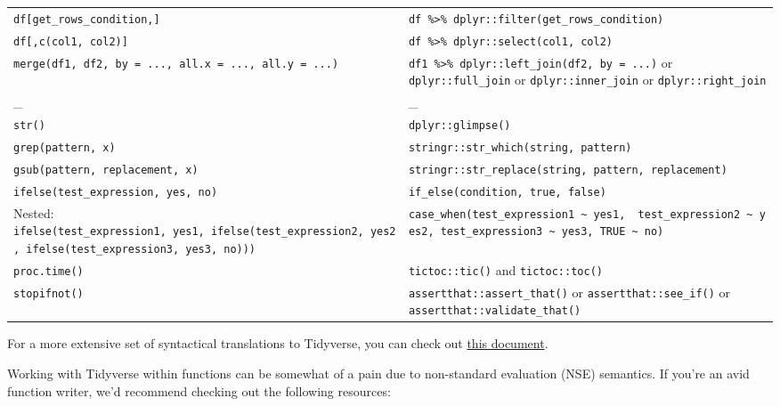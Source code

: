 \documentclass[
]{book}
\begin{document}
{\begin{longtable}[]{@{}
  >{\raggedright\arraybackslash}p{}
  >{\raggedright\arraybackslash}p{}@{}}
\texttt{df{[}get\_rows\_condition,{]}} & \texttt{df\ \%\textgreater{}\%\ dplyr::filter(get\_rows\_condition)} \\
\texttt{df{[},c(col1,\ col2){]}} & \texttt{df\ \%\textgreater{}\%\ dplyr::select(col1,\ col2)} \\
\texttt{merge(df1,\ df2,\ by\ =\ ...,\ all.x\ =\ ...,\ all.y\ =\ ...)} & \texttt{df1\ \%\textgreater{}\%\ dplyr::left\_join(df2,\ by\ =\ ...)} or \texttt{dplyr::full\_join} or \texttt{dplyr::inner\_join} or \texttt{dplyr::right\_join} \\
\_ & \_ \\
\texttt{str()} & \texttt{dplyr::glimpse()} \\
\texttt{grep(pattern,\ x)} & \texttt{stringr::str\_which(string,\ pattern)} \\
\texttt{gsub(pattern,\ replacement,\ x)} & \texttt{stringr::str\_replace(string,\ pattern,\ replacement)} \\
\texttt{ifelse(test\_expression,\ yes,\ no)} & \texttt{if\_else(condition,\ true,\ false)} \\
Nested: \texttt{ifelse(test\_expression1,\ yes1,\ ifelse(test\_expression2,\ yes2,\ ifelse(test\_expression3,\ yes3,\ no)))} & \texttt{case\_when(test\_expression1\ \textasciitilde{}\ yes1,\ \ test\_expression2\ \textasciitilde{}\ yes2,\ test\_expression3\ \textasciitilde{}\ yes3,\ TRUE\ \textasciitilde{}\ no)} \\
\texttt{proc.time()} & \texttt{tictoc::tic()} and \texttt{tictoc::toc()} \\
\texttt{stopifnot()} & \texttt{assertthat::assert\_that()} or \texttt{assertthat::see\_if()} or \texttt{assertthat::validate\_that()} \\
\end{longtable}
}

For a more extensive set of syntactical translations to Tidyverse, you can check out \href{https://tavareshugo.github.io/data_carpentry_extras/base-r_tidyverse_equivalents/base-r_tidyverse_equivalents.html\#reshaping_data}{this document}.

Working with Tidyverse within functions can be somewhat of a pain due to non-standard evaluation (NSE) semantics. If you're an avid function writer, we'd recommend checking out the following resources:
\end{document}

